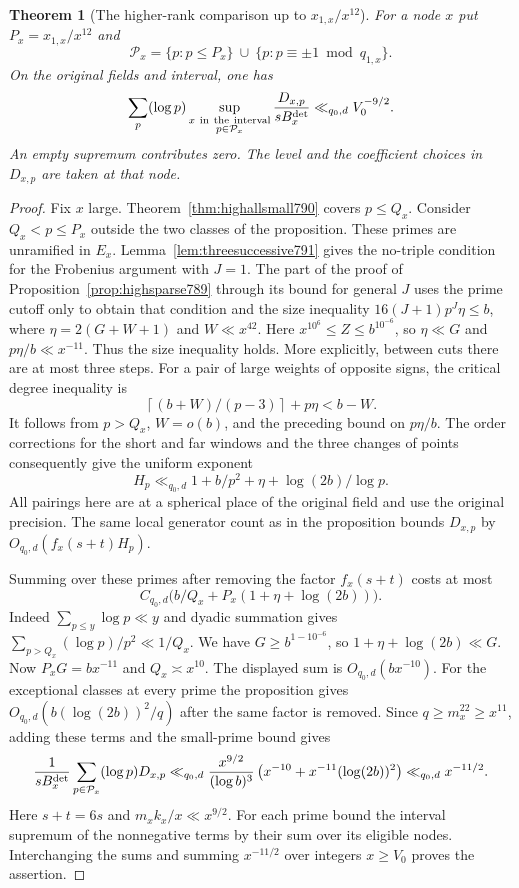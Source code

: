 \documentclass[a4paper,11pt]{article}
\newtheorem{theorem}[proposition]{Theorem}
\theoremstyle{definition}
\theoremstyle{remark}
\numberwithin{equation}{section}
\begin{document}
\begin{theorem}[The higher-rank comparison up to \(x_{1,x}/x^{12}\)]
\leavevmode\label{thm:highmiddle791}
For a node \(x\) put \(P_x=x_{1,x}/x^{12}\) and
\[
  \mathcal P_x=\{p:p\le P_x\}\ \cup\
               \{p:p\equiv\pm1\bmod q_{1,x}\}.
\]
On the original fields and interval, one has
\[
 \sum_p(\log p)\sup_{\substack{x\ {\rm in\ the\ interval}\\
                               p\in\mathcal P_x}}
     \frac{D_{x,p}}{s B_x^{\rm det}}
          \ll_{q_0,d}V_0^{-9/2}.
\]
An empty supremum contributes zero. The level and the
coefficient choices in \(D_{x,p}\) are taken at that node.
\end{theorem}
\begin{proof}
Fix \(x\) large. Theorem~\ref{thm:highallsmall790} covers
\(p\le Q_x\). Consider \(Q_x<p\le P_x\) outside the two
classes of the proposition. These primes are unramified in
\(E_x\). Lemma~\ref{lem:threesuccessive791} gives the
no-triple condition for the Frobenius argument with \(J=1\).
The part of the proof of Proposition~\ref{prop:highsparse789}
through its bound for general \(J\) uses the prime cutoff
only to obtain that condition and the size inequality
\(16(J+1)p^J\eta\le b\), where \(\eta=2(G+W+1)\) and
\(W\ll x^{42}\). Here \(x^{10^6}\le Z\le b^{10^{-6}}\),
so \(\eta\ll G\) and \(p\eta/b\ll x^{-11}\). Thus the size
inequality holds. More explicitly, between cuts there are
at most three steps. For a pair of large weights of opposite
signs, the critical degree inequality is
\[
      \left\lceil(b+W)/(p-3)\right\rceil+p\eta < b-W .
\]
It follows from \(p>Q_x\), \(W=o(b)\), and the preceding
bound on \(p\eta/b\). The order corrections for the short and
far windows and the three changes of points consequently give
the uniform exponent
\[
     H_p\ll_{q_0,d} 1+b/p^2+\eta+\log(2b)/\log p .
\]
All pairings here are at a spherical place of the original
field and use the original precision. The same local generator
count as in the proposition bounds \(D_{x,p}\) by
\(O_{q_0,d}(f_x(s+t)H_p)\).

Summing over these primes after removing the factor \(f_x(s+t)\)
costs at most
\[
       C_{q_0,d}\big(b/Q_x+P_x(1+\eta+\log(2b))\big).
\]
Indeed \(\sum_{p\le y}\log p\ll y\) and dyadic summation gives
\(\sum_{p>Q_x}(\log p)/p^2\ll1/Q_x\). We have
\(G\ge b^{1-10^{-6}}\), so \(1+\eta+\log(2b)\ll G\).
Now \(P_xG=b x^{-11}\) and \(Q_x\asymp x^{10}\).
The displayed sum is \(O_{q_0,d}(b x^{-10})\).
For the exceptional classes at every prime the proposition
gives \(O_{q_0,d}(b(\log(2b))^2/q)\) after the same factor
is removed. Since \(q\ge m_x^{22}\ge x^{11}\), adding these
terms and the small-prime bound gives
\[
 \frac{1}{s B_x^{\rm det}}
      \sum_{p\in\mathcal P_x}(\log p)D_{x,p}
   \ll_{q_0,d}
       \frac{x^{9/2}}{(\log b)^3}
       \left(x^{-10}+x^{-11}(\log(2b))^2\right)
   \ll_{q_0,d} x^{-11/2}.
\]
Here \(s+t=6s\) and \(m_x k_x/x\ll x^{9/2}\).
For each prime bound the interval supremum of the nonnegative
terms by their sum over its eligible nodes. Interchanging
the sums and summing \(x^{-11/2}\) over integers
\(x\ge V_0\) proves the assertion.
\end{proof}
\clearpage
\end{document}
